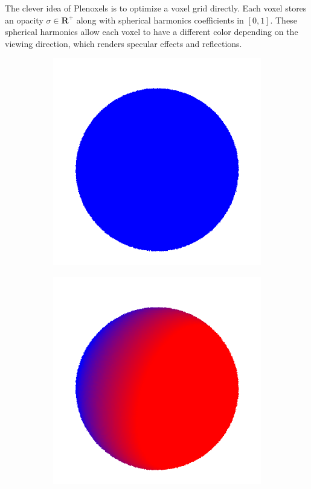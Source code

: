 \documentclass{article}
\begin{document}
The clever idea of Plenoxels is to optimize a voxel grid directly. Each voxel stores an opacity $\sigma \in \mathbf{R}^+$ along with spherical harmonics coefficients in $[0,1]$. These spherical harmonics allow each voxel to have a different color depending on the viewing direction, which renders specular effects and reflections.

\begin{figure}[!h]
 \centering
\begin{subfigure}{.1\textwidth}
  \centering
  \includegraphics[width=\linewidth]{figs/spherical_harmonics/harmonics_0.png}  
\end{subfigure}
\begin{subfigure}{.1\textwidth}
  \centering
  \includegraphics[width=\linewidth]{figs/spherical_harmonics/harmonics_1.png}  

\end{subfigure}
\end{figure}
\end{document}
